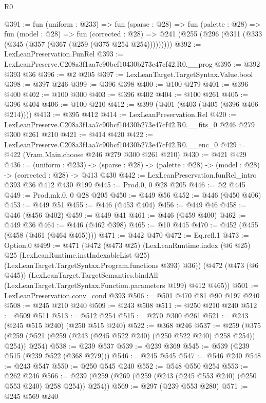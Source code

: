 \begin{lexlean}{R0}
\begin{coremodule}
@391 := fun (uniform : @233) =>
  fun (sparse : @28) =>
  fun (palette : @28) =>
  fun (model : @28) =>
  fun (corrected : @28) =>
  @241 (@255 (@296 (@311 (@333 (@345 (@357 (@367 (@259 (@375 @254 @254)))))))))
@392 := LexLeanPreservation.FunRel
@393 := LexLeanPreserve.C208a3f1aa7c90bcf10430b273e47cf42.R0.__prog
@395 := @392 @393 @36
@396 := @2 @205
@397 := LexLeanTarget.TargetSyntax.Value.bool
@398 := @397 @246
@399 := @396 @398
@400 := @100 @279
@401 := @396 @400
@402 := @100 @300
@403 := @396 @402
@404 := @100 @261
@405 := @396 @404
@406 := @100 @210
@412 := @399 (@401 (@403 (@405 (@396 @406 @214))))
@413 := @395 @412
@414 := LexLeanPreservation.Rel
@420 := LexLeanPreserve.C208a3f1aa7c90bcf10430b273e47cf42.R0.__fits_0 @246 @279 @300 @261 @210
@421 := @414 @420
@422 := LexLeanPreserve.C208a3f1aa7c90bcf10430b273e47cf42.R0.__enc_0
@429 := @422 (Vram.Main.choose @246 @279 @300 @261 @210)
@430 := @421 @429
@436 := (uniform : @233) ->
  (sparse : @28) -> (palette : @28) -> (model : @28) -> (corrected : @28) -> @413 @430
@442 := LexLeanPreservation.funRel_intro @393 @36 @412 @430 @199
@445 := Prod.{0, 0} @28 @205
@446 := @2 @445
@449 := Prod.mk.{0, 0} @28 @205
@450 := @449 @56
@452 := @446 (@450 @406)
@453 := @449 @51
@455 := @446 (@453 @404)
@456 := @449 @46
@458 := @446 (@456 @402)
@459 := @449 @41
@461 := @446 (@459 @400)
@462 := @449 @36
@464 := @446 (@462 @398)
@465 := @10 @445
@470 := @452 (@455 (@458 (@461 (@464 @465))))
@471 := @442 @470
@472 := Eq.refl.{1}
@473 := Option.{0}
@499 := @471
    (@472
      (@473 @25)
      (LexLeanRuntime.index
        (@6 @25)
        @25
        (LexLeanRuntime.instIndexableList @25)
        (LexLeanTarget.TargetSyntax.Program.functions @393)
        @36))
    (@472
      (@473 (@6 @445))
      (LexLeanTarget.TargetSemantics.bindAll
        (LexLeanTarget.TargetSyntax.Function.parameters @199)
        @412
        @465))
@501 := LexLeanPreservation.conv_cond @393
@506 := @501 @470 @81 @90 @197 @240
@508 := @245 @210 @240
@509 := @243 @508
@511 := @250 @210 @240
@512 := @509 @511
@513 := @512 @254
@515 := @270 @300 @261
@521 := @243 (@245 @515 @240) (@250 @515 @240)
@522 := @368 @246
@537 := @259
    (@375 (@259 (@521 (@259 (@243 (@245 @522 @240) (@250 @522 @240) @258 @254)) @254)) @254)
@538 := @239 @537
@539 := @239 @369
@545 := @539 (@239 @515 (@239 @522 (@368 @279)))
@546 := @245 @545
@547 := @546 @240
@548 := @243 @547
@550 := @250 @545 @240
@552 := @548 @550 @254
@553 := @262 @246
@566 := @239 (@259 (@269 (@259 (@243 (@245 @553 @240) (@250 @553 @240) @258 @254)) @254))
@569 := @297 (@239 @553 @280)
@571 := @245 @569 @240

\end{coremodule}
\end{lexlean}
